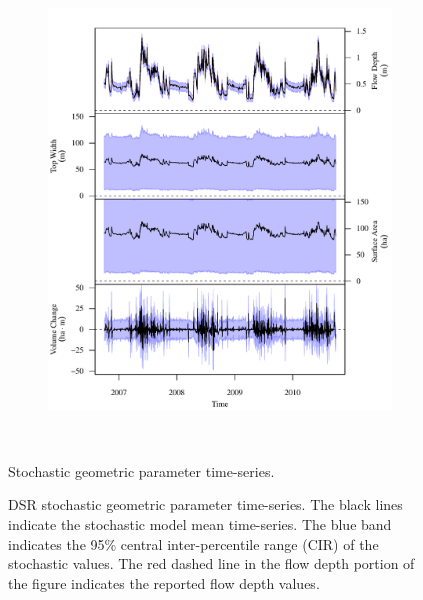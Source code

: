 \begin{linenumbers}
\subfiguremid
\begin{landscape}
	\begin{figure}
		\begin{subfigure}{0.7\textwidth}
			\centering
			\includegraphics[width=\textwidth]{"Figures/Results_USR/Stochastic/G TS E"}
			\label{sub:GeoTS_E}	
		\end{subfigure}\\
		\caption{Stochastic geometric parameter time-series.}
	\end{figure}
\end{landscape}

\subfiguretop
\begin{landscape}
	\begin{figure}
		\caption[DSR stochastic geometric parameter time-series.]{DSR stochastic geometric parameter time-series. The black lines indicate the stochastic model mean time-series.  The blue band indicates the 95\% central inter-percentile range (CIR) of the stochastic values.  The red dashed line in the flow depth portion of the figure indicates the reported flow depth values.}
		\label{fig:GeoTS_DS}
	\end{figure}
\end{landscape}


\end{linenumbers}
